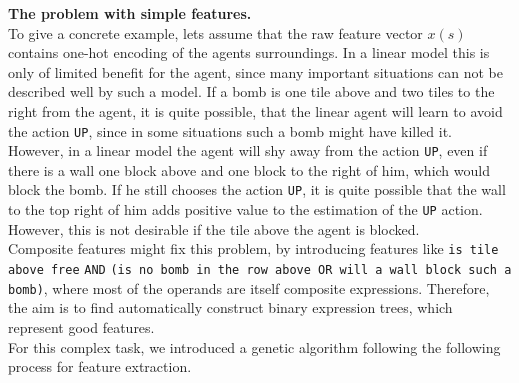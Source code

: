 \textbf{The problem with simple features.} \\

To give a concrete example, lets assume that the raw feature vector $x(s)$ contains one-hot encoding of the agents surroundings. In a linear model this is only of limited benefit for the agent, since many important situations can not be described well by such a model. If a bomb is one tile above and two tiles to the right from the agent, it is quite possible, that the linear agent will learn to avoid the action \texttt{UP}, since in some situations such a bomb might have killed it. However, in a linear model the agent will shy away from the action \texttt{UP}, even if there is a wall one block above and one block to the right of him, which would block the bomb. If he still chooses the action \texttt{UP}, it is quite possible that the wall to the top right of him adds positive value to the estimation of the \texttt{UP} action. However, this is not desirable if the tile above the agent is blocked. \\

Composite features might fix this problem, by introducing features like \texttt{is tile above free} \texttt{AND} \texttt{(is no bomb in the row above OR will a wall block such a bomb)}, \linebreak where most of the operands are itself composite expressions. Therefore, the aim is to find automatically construct binary expression trees, which represent good features. \\

For this complex task, we introduced a genetic algorithm following the following process for feature extraction. 

